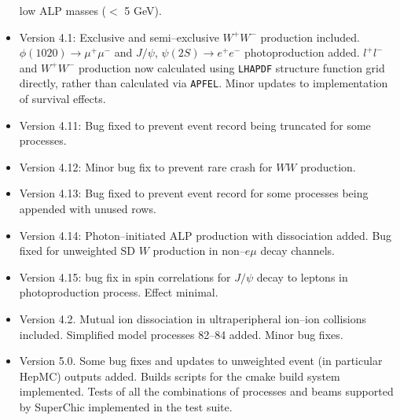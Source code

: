 \documentclass[12pt]{article}
\begin{document}
\begin{itemize}
low ALP masses ($<$ 5 GeV).
\item Version 4.1: Exclusive and semi--exclusive $W^+ W^-$ production included.  $\phi(1020)\to \mu^+ \mu^-$ and $J/\psi$, $\psi(2S) \to e^+ e^-$ 
photoproduction added. $l^+ l^-$ and $W^+ W^-$ production now calculated using \texttt{LHAPDF} structure function grid directly, rather than calculated 
via \texttt{APFEL}. Minor updates to implementation of survival effects.
\item Version 4.11: Bug fixed to prevent event record being truncated for some processes.
\item Version 4.12: Minor bug fix to prevent rare crash for $WW$ production.
\item Version 4.13: Bug fixed to prevent event record for some processes being appended with unused rows.
\item Version 4.14: Photon--initiated ALP production with dissociation added. Bug fixed for unweighted SD $W$ production in non--$e\mu$ decay channels.
\item Version 4.15: bug fix in spin correlations for $J/\psi$ decay to leptons in photoproduction process. Effect minimal.
\item Version 4.2. Mutual ion dissociation in ultraperipheral ion--ion collisions included. Simplified model processes 82--84 added. Minor bug fixes.
\item Version 5.0. Some bug fixes and updates to unweighted event (in particular HepMC) outputs  added. Builds scripts for the cmake build system  implemented.
 Tests of all the combinations of  processes and beams supported by SuperChic  implemented in the test suite.

\end{itemize}


%
{}

\end{document}
